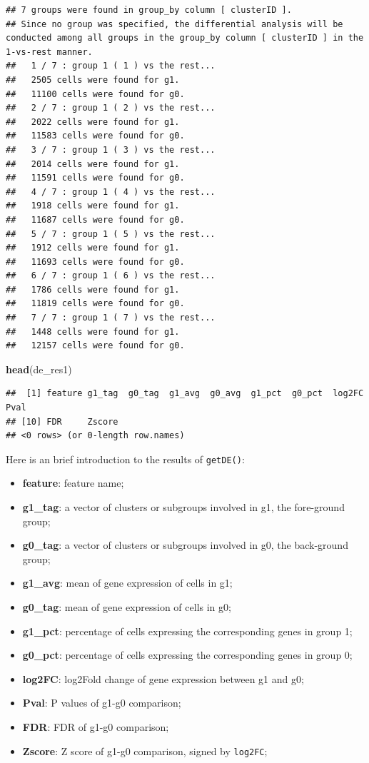 \documentclass[
  12pt,
]{book}
\newenvironment{Shaded}{\begin{snugshade}}{\end{snugshade}}
\newcommand{\FunctionTok}[1]{\textcolor[rgb]{0.13,0.29,0.53}{\textbf{#1}}}
\newcommand{\NormalTok}[1]{#1}
\providecommand{\tightlist}{%
  \setlength{\itemsep}{0pt}\setlength{\parskip}{0pt}}
\begin{document}
\begin{verbatim}
## 7 groups were found in group_by column [ clusterID ].
## Since no group was specified, the differential analysis will be conducted among all groups in the group_by column [ clusterID ] in the 1-vs-rest manner.
##   1 / 7 : group 1 ( 1 ) vs the rest...
##   2505 cells were found for g1.
##   11100 cells were found for g0.
##   2 / 7 : group 1 ( 2 ) vs the rest...
##   2022 cells were found for g1.
##   11583 cells were found for g0.
##   3 / 7 : group 1 ( 3 ) vs the rest...
##   2014 cells were found for g1.
##   11591 cells were found for g0.
##   4 / 7 : group 1 ( 4 ) vs the rest...
##   1918 cells were found for g1.
##   11687 cells were found for g0.
##   5 / 7 : group 1 ( 5 ) vs the rest...
##   1912 cells were found for g1.
##   11693 cells were found for g0.
##   6 / 7 : group 1 ( 6 ) vs the rest...
##   1786 cells were found for g1.
##   11819 cells were found for g0.
##   7 / 7 : group 1 ( 7 ) vs the rest...
##   1448 cells were found for g1.
##   12157 cells were found for g0.
\end{verbatim}

\begin{Shaded}
\begin{Highlighting}[]
\FunctionTok{head}\NormalTok{(de\_res1)}
\end{Highlighting}
\end{Shaded}

\begin{verbatim}
##  [1] feature g1_tag  g0_tag  g1_avg  g0_avg  g1_pct  g0_pct  log2FC  Pval   
## [10] FDR     Zscore 
## <0 rows> (or 0-length row.names)
\end{verbatim}

Here is an brief introduction to the results of \texttt{getDE()}:

\begin{itemize}
\tightlist
\item
  \textbf{feature}: feature name;
\item
  \textbf{g1\_tag}: a vector of clusters or subgroups involved in g1, the fore-ground group;
\item
  \textbf{g0\_tag}: a vector of clusters or subgroups involved in g0, the back-ground group;
\item
  \textbf{g1\_avg}: mean of gene expression of cells in g1;
\item
  \textbf{g0\_tag}: mean of gene expression of cells in g0;
\item
  \textbf{g1\_pct}: percentage of cells expressing the corresponding genes in group 1;
\item
  \textbf{g0\_pct}: percentage of cells expressing the corresponding genes in group 0;
\item
  \textbf{log2FC}: log2Fold change of gene expression between g1 and g0;
\item
  \textbf{Pval}: P values of g1-g0 comparison;
\item
  \textbf{FDR}: FDR of g1-g0 comparison;
\item
  \textbf{Zscore}: Z score of g1-g0 comparison, signed by \texttt{log2FC};
\end{itemize}
\end{document}
